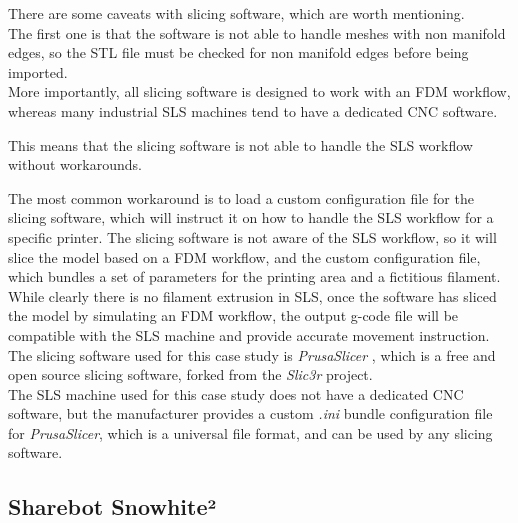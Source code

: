 \documentclass{article}
\begin{document}
        There are some caveats with slicing software, which are worth mentioning. \\

        The first one is that the software is not able to handle meshes with non manifold edges, so 
        the STL file must be checked for non manifold edges before being imported. \\ 

        More importantly, all slicing software is designed to work with an FDM workflow, whereas 
        many industrial SLS machines tend to have a dedicated CNC software. 

        This means that the slicing software is not able to handle the SLS workflow without workarounds. 

        The most common workaround is to load a custom configuration file for the slicing software, 
        which will instruct it on how to handle the SLS workflow for a specific printer. 
        The slicing software is not aware of the SLS workflow, so it will slice the model 
        based on a FDM workflow, and the custom configuration file, which bundles a set of 
        parameters for the printing area and a fictitious filament. \\ 

        While clearly there is no filament extrusion in SLS, once the software has sliced the model by simulating 
        an FDM workflow, the output g-code file will be compatible with the SLS machine and provide 
        accurate movement instruction. \\

        The slicing software used for this case study is \textit{PrusaSlicer} \autocites{PrusaSlicer}, 
        which is a free and open source slicing software, forked from the \textit{Slic3r} project. \\

        The SLS machine used for this case study does not have a dedicated CNC software, but the 
        manufacturer provides a custom \textit{.ini} bundle configuration file for \textit{PrusaSlicer}, which is
        a universal file format, and can be used by any slicing software. \\
        
        
        \clearpage

        \subsection{Sharebot Snowhite²\label{Sharebot_Snowhite²}}
\end{document}
